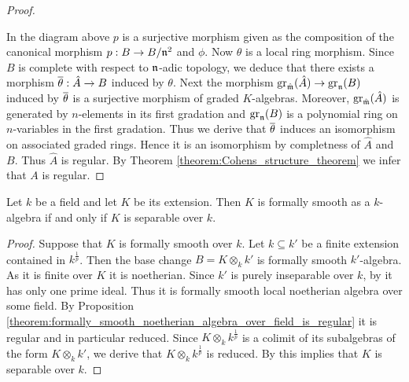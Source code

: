 \begin{proof}
\begin{center}
\end{center}
In the diagram above $p$ is a surjective morphism given as the composition of the canonical morphism $p:B\rightarrow B/\mathfrak{n}^2$ and $\phi$. Now $\theta$ is a local ring morphism. Since $B$ is complete with respect to $\mathfrak{n}$-adic topology, we deduce that there exists a morphism $\overline{\theta}:\hat{A}\rightarrow B$ induced by $\theta$. Next the morphism $\mathrm{gr}_{\hat{\mathfrak{m}}}(\hat{A})\rightarrow \mathrm{gr}_{\mathfrak{n}}(B)$ induced by $\overline{\theta}$ is a surjective morphism of graded $K$-algebras. Moreover, $\mathrm{gr}_{\hat{\mathfrak{m}}}(\hat{A})$ is generated by $n$-elements in its first gradation and $\mathrm{gr}_{\mathfrak{n}}(B)$ is a polynomial ring on $n$-variables in the first gradation. Thus we derive that $\overline{\theta}$ induces an isomorphism on associated graded rings. Hence it is an isomorphism by completness of $\hat{A}$ and $B$. Thus $\hat{A}$ is regular. By Theorem \ref{theorem:Cohens_structure_theorem} we infer that $A$ is regular.
\end{proof}

\begin{corollary}\label{corollary:over_field_formal_smoothness_is_separability}
Let $k$ be a field and let $K$ be its extension. Then $K$ is formally smooth as a $k$-algebra if and only if $K$ is separable over $k$. 
\end{corollary}
\begin{proof}
Suppose that $K$ is formally smooth over $k$. Let $k\subseteq k'$ be a finite extension contained in $k^{\frac{1}{p}}$. Then the base change $B=K\otimes_kk'$ is formally smooth $k'$-algebra. As it is finite over $K$ it is noetherian. Since $k'$ is purely inseparable over $k$, by {\cite[Proposition 3.2]{Topics_in_fields}} it has only one prime ideal. Thus it is formally smooth local noetherian algebra over some field. By Proposition \ref{theorem:formally_smooth_noetherian_algebra_over_field_is_regular} it is regular and in particular reduced. Since $K\otimes_kk^{\frac{1}{p}}$ is a colimit of its subalgebras of the form $K\otimes_kk'$, we derive that $K\otimes_kk^{\frac{1}{p}}$ is reduced. By {\cite[Theorem 4.3]{Topics_in_fields}} this implies that $K$ is separable over $k$.
\end{proof}

